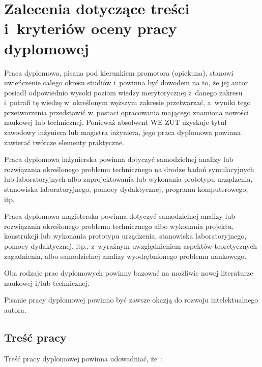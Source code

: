 \documentclass[skorowidz,skroty]{dyplomWEZUT}
\begin{document}


\chapter{Zalecenia dotyczące treści i~kryteriów oceny pracy dyplomowej}\label{chap:pierwszy}

Praca dyplomowa, pisana pod kierunkiem promotora (opiekuna), stanowi uwieńczenie całego okresu studiów i~powinna być dowodem na to, że jej autor posiadł odpowiednio wysoki poziom wiedzy merytorycznej z~danego zakresu i~potrafi tę wiedzę w~określonym węższym zakresie przetwarzać, a~wyniki tego przetworzenia przedstawić w~postaci opracowania mającego znamiona nowości naukowej lub technicznej. Ponieważ absolwent WE ZUT uzyskuje tytuł zawodowy inżyniera lub magistra inżyniera, jego praca dyplomowa powinna zawierać twórcze elementy praktyczne. 

Praca dyplomowa inżynierska powinna dotyczyć samodzielnej analizy lub rozwiązania określonego problemu technicznego na drodze badań symulacyjnych lub laboratoryjnych albo zaprojektowania lub wykonania prototypu urządzenia, stanowiska laboratoryjnego, pomocy dydaktycznej, programu komputerowego, itp.

Praca dyplomowa magisterska powinna dotyczyć samodzielnej analizy lub rozwiązania określonego problemu technicznego albo wykonania projektu, konstrukcji lub wykonania prototypu urządzenia, stanowiska laboratoryjnego, pomocy dydaktycznej, itp., z~wyraźnym uwzględnieniem aspektów teoretycznych zagadnienia, albo samodzielnej analizy wyodrębnionego problemu naukowego.

Oba rodzaje prac dyplomowych powinny bazować na możliwie nowej literaturze naukowej i/lub technicznej.

Pisanie pracy dyplomowej powinno być zawsze okazją do rozwoju intelektualnego autora.

\section{Treść pracy}\label{sec:trescpracy}

Treść pracy dyplomowej powinna udowadniać, że~\cite{Zenderowski2004}:
\end{document}
